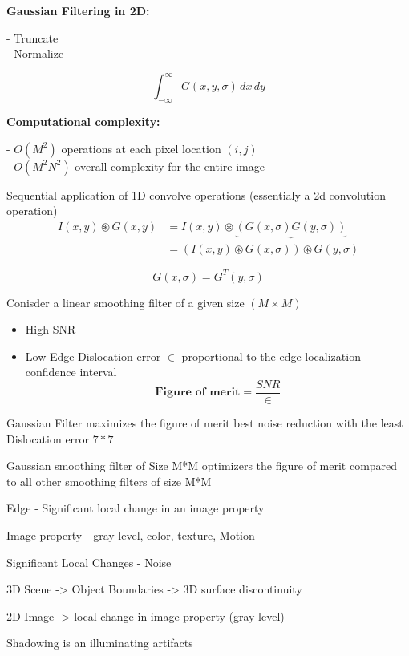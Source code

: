 \documentclass[11pt]{article}
\theoremstyle{definition}
\begin{document}
\textbf{Gaussian Filtering in 2D:}  

- Truncate \\
- Normalize  

\[
\int_{-\infty}^{\infty} G(x, y, \sigma)\, dx\, dy
\]

\textbf{Computational complexity:}  

- $O(M^2)$ operations at each pixel location $(i, j)$  \\
- $O(M^2 N^2)$ overall complexity for the entire image

Sequential application of 1D convolve operations (essentialy a 2d convolution operation)
\begin{equation}
\begin{aligned}
I(x,y) \circledast G(x, y) &= I(x,y) \circledast \underbrace{(G(x,\sigma) G(y,\sigma))} \\
&= (I(x,y) \circledast G(x,\sigma))\circledast G(y, \sigma)
\end{aligned}
\end{equation}

\[
G(x, \sigma) = G^{\mathit{T}}(y, \sigma)
\]


Conisder a linear smoothing filter of a given size $(M\times M)$

\begin{itemize}
    \item[-] High SNR
    \item[-] Low Edge Dislocation error $\in$ proportional to the edge localization confidence interval
    \[
    \textbf{Figure of merit} = \frac{SNR}{\in}
    \]
\end{itemize}

Gaussian Filter maximizes the figure of merit
best noise reduction with the least Dislocation error
$7*7$

Gaussian smoothing filter of Size M*M optimizers the figure of merit compared to all other smoothing filters of size M*M

\newpage
\pagestyle{plain}


Edge - Significant local change in an image property

Image property - gray level, color, texture, Motion

Significant Local Changes - Noise

3D Scene -> Object Boundaries -> 3D surface discontinuity 

2D Image -> local change in image property (gray level)

Shadowing is an illuminating artifacts
\end{document}
